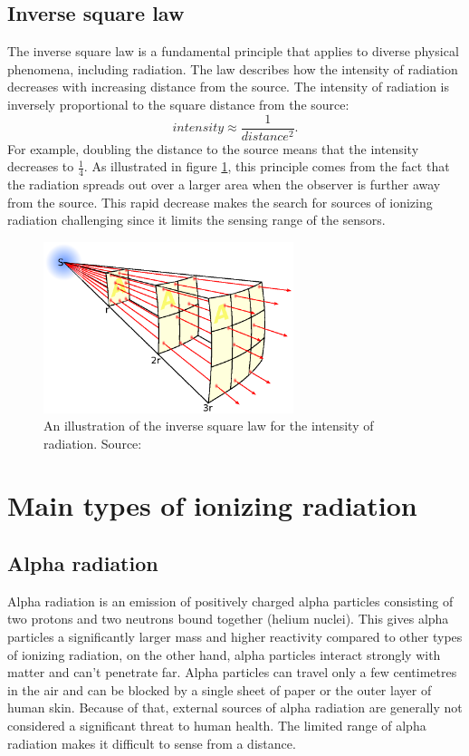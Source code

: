\subsection{Inverse square law}%
The inverse square law is a fundamental principle that applies to diverse physical phenomena, including radiation.
The law describes how the intensity of radiation decreases with increasing distance from the source.
The intensity of radiation is inversely proportional to the square distance from the source:
\begin{equation}
  intensity \approx \frac{1}{distance^2}.
\end{equation}
For example, doubling the distance to the source means that the intensity decreases to $\frac{1}{4}$.
As illustrated in figure \ref{fig:islaw}, this principle comes from the fact that the radiation spreads out over a larger area when the observer is further away from the source.
This rapid decrease makes the search for sources of ionizing radiation challenging since it limits the sensing range of the sensors.

  \begin{figure}[!h]
    \centering
      \includegraphics[width=0.65\textwidth]{./fig/photos/Inverse_square_law.eps}
    \caption{An illustration of the inverse square law for the intensity of radiation. Source: \cite{inverse_square_law}}
      \label{fig:islaw}
  \end{figure}

\section{Main types of ionizing radiation}
\subsection{Alpha radiation}
Alpha radiation is an emission of positively charged alpha particles consisting of two protons and two neutrons bound together (helium nuclei).
This gives alpha particles a significantly larger mass and higher reactivity compared to other types of ionizing radiation, on the other hand, alpha particles interact strongly with matter and can't penetrate far.
Alpha particles can travel only a few centimetres in the air and can be blocked by a single sheet of paper or the outer layer of human skin.
Because of that, external sources of alpha radiation are generally not considered a significant threat to human health.
The limited range of alpha radiation makes it difficult to sense from a distance.

